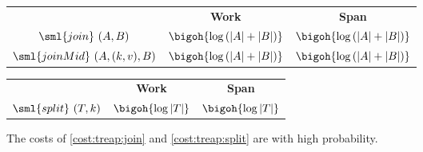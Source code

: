 \begin{cluster}
\label{grp:cost:treap:join}

\begin{costspec}[Join]
\label{cost:treap:join}
\begin{tabular}{c|c|c}
& \textbf{Work} & \textbf{Span} \\
$\sml{join}~(A,B)$ & $\bigoh {\log\left(|A| + |B|\right)}$ & $\bigoh {\log\left(|A| + |B|\right)}$ \\
$\sml{joinMid}~(A,(k,v),B)$ & $\bigoh {\log\left(|A| + |B|\right)}$ & $\bigoh {\log\left(|A| + |B|\right)}$
\end{tabular}

\end{costspec}
\end{cluster}

\begin{cluster}
\label{grp:cost:treap:split}

\begin{costspec}[Split]
\label{cost:treap:split}
\begin{tabular}{c|c|c}
& \textbf{Work} & \textbf{Span} \\
$\sml{split}~(T,k)$ & $\bigoh {\log|T|}$ & $\bigoh {\log|T|}$
\end{tabular}

\end{costspec}
\end{cluster}

\begin{cluster}
\label{grp:nt:treap-bst::costs}

\begin{note}
\label{nt:treap-bst::costs}
The costs of \ref{cost:treap:join} and \ref{cost:treap:split} are with
high probability.

\end{note}
\end{cluster}

